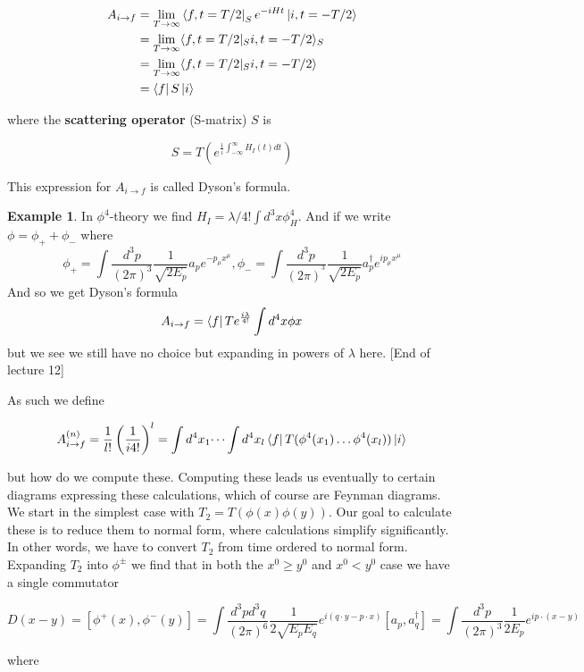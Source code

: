 \documentclass{article}
\theoremstyle{definition}
\newtheorem{example}{Example}
\begin{document}
\begin{align*}
  A_{i \to f} &= \lim_{T \to \infty} \bra{f, t = T /2}_S e^{-iHt} \ket{i, t = -T/2} \\
              &= \lim_{T \to \infty} \langle f, t = T/2 |_S i, t=-T/2 \rangle_S \\
              &= \lim_{T \to \infty} \langle f, t = T/2 |_S i, t=-T/2 \rangle \\
              &= \bra{f} S \ket{i}
\end{align*}

where the \textbf{scattering operator} (S-matrix) $S$ is

$$ S = T(e^{\frac{1}{i} \int_{-\infty}^\infty H_I(t) dt}) $$

This expression for $A_{i\to f}$ is called Dyson's formula.

\begin{example}
  In $\phi^4$-theory we find $H_I = \lambda / 4! \int d^3x \phi^4_H$. And if we
  write $\phi = \phi_+ + \phi_-$ where
  $$ \phi_+ = \int \frac{d^3p}{(2\pi)^3} \frac{1}{\sqrt{2E_p}} a_p e^{-p_\mu
    x^\mu}, \phi_- = \int \frac{d^3p}{(2\pi)^^3} \frac{1}{\sqrt{2 E_p}}
  a_p^\dagger e^{ip_\mu x^\mu} $$
  And so we get Dyson's formula
  $$ A_{i\to f} = \bra{f} Te^{\frac{i \lambda}{4!}} \int d^4x \phi{x} $$
  but we see we still have no choice but expanding in powers of $\lambda$ here.
  [End of lecture 12]
\end{example}

As such we define

$$ A_{i \to f}^{(n)} = \frac{1}{l!} \left( \frac{1}{i4!} \right)^l = \int
d^4x_1 \dots \int d^4x_l \bra{f} T(\phi^4(x_1) \dots \phi^4(x_l)) \ket{i} $$

but how do we compute these. Computing these leads us eventually to certain
diagrams expressing these calculations, which of course are Feynman diagrams. We
start in the simplest case with $T_2 = T(\phi(x) \phi(y))$. Our goal to
calculate these is to reduce them to normal form, where calculations simplify
significantly. In other words, we have to convert $T_2$ from time ordered to
normal form. Expanding $T_2$ into $\phi^\pm$ we find that in both the $x^0 \geq
y^0$ and $x^0 < y^0$ case we have a single commutator

$$ D(x - y) = [\phi^+(x), \phi^-(y)] = \int \frac{d^3p d^3q}{(2\pi)^6}
\frac{1}{2\sqrt{E_p E_q}} e^{i(q \cdot y - p \cdot x)} [a_p, a_q^\dagger] = \int
\frac{d^3p}{(2\pi)^3} \frac{1}{2E_p} e^{ip \cdot (x - y)} $$

where
\end{document}
